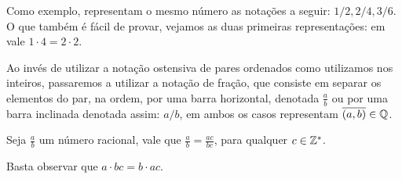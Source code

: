 \documentclass[../main.tex]{subfiles}
\begin{document}
Como exemplo, representam o mesmo número as notações a seguir: $1/2, 2/4, 3/6$. O que também é fácil de provar, vejamos as duas primeiras representações: em \Z vale $1 \cdot 4 = 2 \cdot 2$.

\begin{obs}
    Ao invés de utilizar a notação ostensiva de pares ordenados como utilizamos nos inteiros, passaremos a utilizar a notação de fração, que consiste em separar os elementos do par, na ordem, por uma barra horizontal, denotada $\frac{a}{b}$ ou por uma barra inclinada denotada assim: $a/b$, em ambos os casos representam $\overline{\left( a,b \right)} \in \mathbb{Q}$. 
\end{obs}

\begin{prop}
    Seja $\frac{a}{b}$ um número racional, vale que $ \frac{a}{b} = \frac{ac}{bc}$, para qualquer $c \in \mathbb{Z}^*$.
\end{prop}
\begin{dem}
    Basta observar que $a \cdot bc = b \cdot ac$.
\end{dem}
\end{document}

